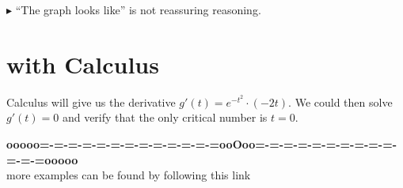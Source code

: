 \documentclass{ximera}
\begin{document}
\textbf{\textcolor{red!80!black}{$\blacktriangleright$}} ``The graph looks like'' is not reassuring reasoning. 







\section{with Calculus}

Calculus will give us the derivative $g'(t) = e^{-t^2} \cdot (-2t)$.  We could then solve $g'(t) = 0$ and verify that the only critical number is $t = 0$.












\begin{center}
\textbf{\textcolor{green!50!black}{ooooo=-=-=-=-=-=-=-=-=-=-=-=-=ooOoo=-=-=-=-=-=-=-=-=-=-=-=-=ooooo}} \\

more examples can be found by following this link\\ 

\end{center}
\end{document}
